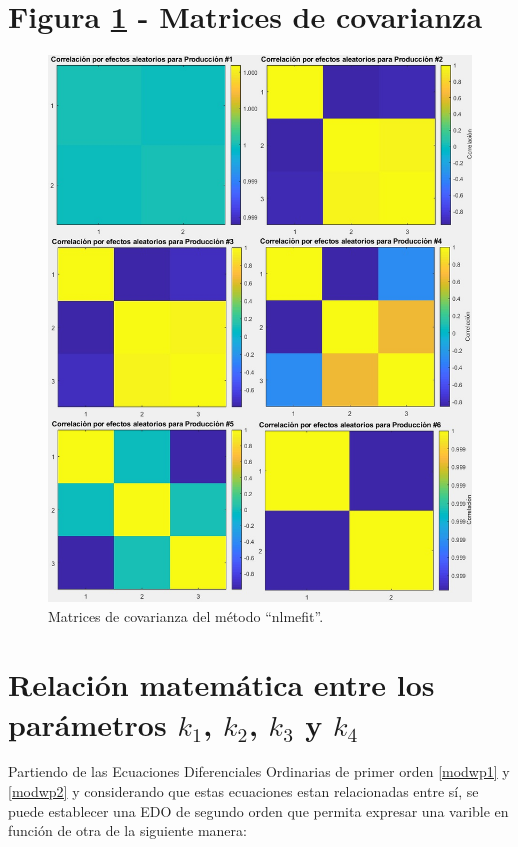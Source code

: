 \section{Figura \ref{covmatricespng} - Matrices de covarianza} \label{anexocovmatricespng}

\begin{figure}[H]
	 \begin{center}
	 \includegraphics[scale=0.604]{img/covmatricesspa.jpg}
	 \end{center}
	 \caption{Matrices de covarianza del método ``nlmefit''. \label{covmatricespng}}
\end{figure}

\section{Relación matemática entre los parámetros $k_{1}$, $k_{2}$, $k_{3}$ y $k_{4}$}\label{demostralabel}

Partiendo de las Ecuaciones Diferenciales Ordinarias de primer orden \ref{modwp1} y \ref{modwp2} y considerando que estas ecuaciones estan relacionadas entre sí, se puede establecer una EDO de segundo orden que permita expresar una varible en función de otra de la siguiente manera:

